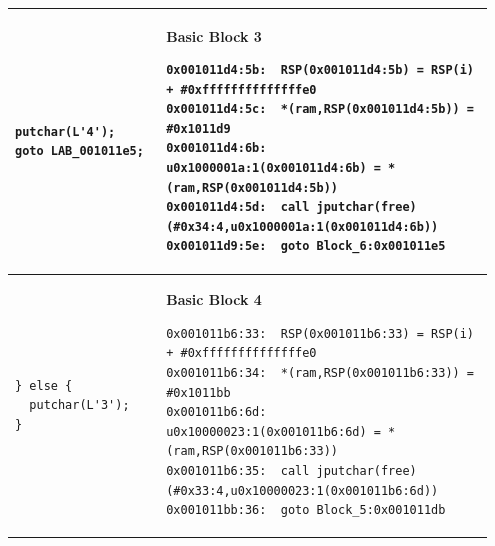 \begin{longtable}{|p{0.30\linewidth}|p{0.65\linewidth}|}
    \begin{minipage}[t]{\linewidth}
        \vspace{1mm}
        \begin{lstlisting}[style=CStyle]
putchar(L'4');
goto LAB_001011e5;
        \end{lstlisting}
        \vspace{1mm}
    \end{minipage}
    & 
    \begin{minipage}[t]{\linewidth}
        \vspace{1mm}
        \textbf{\scriptsize Basic Block 3}
        \begin{lstlisting}[style=PCodeStyle]
0x001011d4:5b:	RSP(0x001011d4:5b) = RSP(i) + #0xffffffffffffffe0
0x001011d4:5c:	*(ram,RSP(0x001011d4:5b)) = #0x1011d9
0x001011d4:6b:	u0x1000001a:1(0x001011d4:6b) = *(ram,RSP(0x001011d4:5b))
0x001011d4:5d:	call jputchar(free)(#0x34:4,u0x1000001a:1(0x001011d4:6b))
0x001011d9:5e:	goto Block_6:0x001011e5
        \end{lstlisting}
        \vspace{1mm}
    \end{minipage}
    \\ \hline

    \begin{minipage}[t]{\linewidth}
        \vspace{1mm}
        \begin{lstlisting}[style=CStyle]
} else {
  putchar(L'3');
}
        \end{lstlisting}
        \vspace{1mm}
    \end{minipage}
    & 
    \begin{minipage}[t]{\linewidth}
        \vspace{1mm}
        \textbf{\scriptsize Basic Block 4}
        \begin{lstlisting}[style=PCodeStyle]
0x001011b6:33:	RSP(0x001011b6:33) = RSP(i) + #0xffffffffffffffe0
0x001011b6:34:	*(ram,RSP(0x001011b6:33)) = #0x1011bb
0x001011b6:6d:	u0x10000023:1(0x001011b6:6d) = *(ram,RSP(0x001011b6:33))
0x001011b6:35:	call jputchar(free)(#0x33:4,u0x10000023:1(0x001011b6:6d))
0x001011bb:36:	goto Block_5:0x001011db
        \end{lstlisting}
        \vspace{1mm}
    \end{minipage}
    \\ \hline


\end{longtable}
